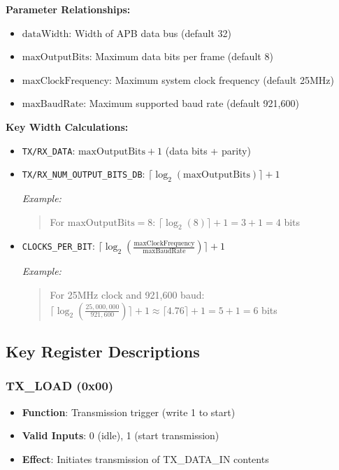 \textbf{Parameter Relationships:}
\begin{itemize}
\item $\text{dataWidth}$: Width of APB data bus (default 32)
\item $\text{maxOutputBits}$: Maximum data bits per frame (default 8)
\item $\text{maxClockFrequency}$: Maximum system clock frequency (default 25MHz)
\item $\text{maxBaudRate}$: Maximum supported baud rate (default 921,600)
\end{itemize}

\textbf{Key Width Calculations:}
\begin{itemize}
\item \texttt{TX/RX\_DATA}: $\text{maxOutputBits}+1$ (data bits + parity)
\item \texttt{TX/RX\_NUM\_OUTPUT\_BITS\_DB}: $\lceil\log_2(\text{maxOutputBits})\rceil+1$ 

\textit{Example:}
\begin{quote}
For $\text{maxOutputBits}=8$: $\lceil\log_2(8)\rceil+1 = 3+1 = 4$ bits
\end{quote}

\item \texttt{CLOCKS\_PER\_BIT}: $\lceil\log_2(\frac{\text{maxClockFrequency}}{\text{maxBaudRate}})\rceil+1$

\textit{Example:}
\begin{quote}
For 25MHz clock and 921,600 baud: \\
$\lceil\log_2(\frac{25,000,000}{921,600})\rceil+1 \approx \lceil 4.76\rceil +1 = 5+1 = 6$ bits
\end{quote}
\end{itemize}

\subsection{Key Register Descriptions}

\subsubsection{TX\_LOAD (0x00)}
\begin{itemize}
\item \textbf{Function}: Transmission trigger (write 1 to start)
\item \textbf{Valid Inputs}: 0 (idle), 1 (start transmission)
\item \textbf{Effect}: Initiates transmission of TX\_DATA\_IN contents
\end{itemize}

